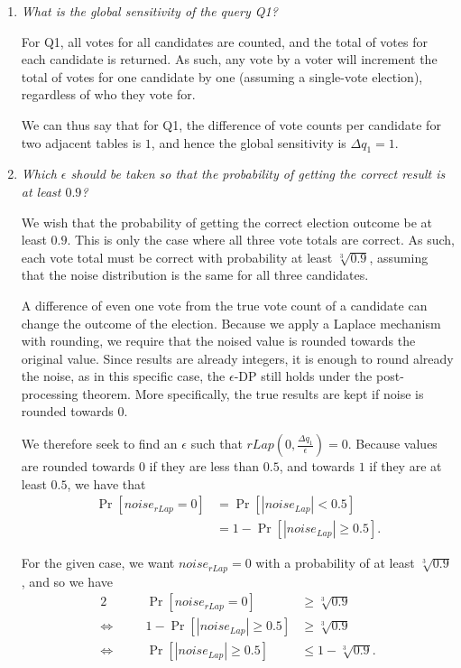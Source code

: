 \documentclass[parskip=half]{scrartcl}
\begin{document}
\begin{enumerate}
    \item \textit{What is the global sensitivity of the query Q1?}
    
    For Q1, all votes for all candidates are counted, and the total of votes
    for each candidate is returned. As such, any vote by a voter will increment
    the total of votes for one candidate by one (assuming a single-vote
    election), regardless of who they vote for.

    We can thus say that for Q1, the difference of vote counts per candidate
    for two adjacent tables is $1$, and hence the global sensitivity is
    $\Delta q_1 = 1$.
    
    \item \textit{Which $\epsilon$ should be taken so that the probability of
    getting the correct result is at least $0.9$?}

    We wish that the probability of getting the correct election outcome be at
    least $0.9$. This is only the case where all three vote totals are correct.
    As such, each vote total must be correct with probability at least
    $\sqrt[3]{0.9}$, assuming that the noise distribution is the same for all
    three candidates.

    A difference of even one vote from the true vote count of a candidate can
    change the outcome of the election. Because we apply a Laplace mechanism
    with rounding, we require that the noised value is rounded towards the
    original value. Since results are already integers, it is enough to round
    already the noise, as in this specific case, the $\epsilon$-DP still holds
    under the post-processing theorem. More specifically, the true results are
    kept if noise is rounded towards $0$.

    We therefore seek to find an $\epsilon$ such that $\textit{rLap}\left(0,
    \frac{\Delta q_1}{\epsilon}\right) = 0$. Because values are rounded towards
    $0$ if they are less than $0.5$, and towards $1$ if they are at least
    $0.5$, we have that
    \begin{align*}
        \Pr[\textit{noise}_\textit{rLap} = 0]
        &= \Pr[|\textit{noise}_\textit{Lap}| < 0.5]\\
        &= 1 - \Pr[|\textit{noise}_\textit{Lap}| \ge 0.5].
    \end{align*}

    For the given case, we want $\textit{noise}_\textit{rLap} = 0$ with a
    probability of at least $\sqrt[3]{0.9}$, and so we have
    \begin{alignat*}{2}
        \quad &&
        \Pr[\textit{noise}_\textit{rLap} = 0] &\ge \sqrt[3]{0.9}\\
        \Leftrightarrow\quad &&
        1 - \Pr[|\textit{noise}_\textit{Lap}| \ge 0.5] &\ge \sqrt[3]{0.9}\\
        \Leftrightarrow\quad &&
        \Pr[|\textit{noise}_\textit{Lap}| \ge 0.5] &\le 1 - \sqrt[3]{0.9}.
    \end{alignat*}


\end{enumerate}
\end{document}
